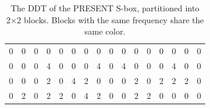 \begin{table}
    \caption{The DDT of the PRESENT S-box, partitioned into 2×2 blocks. Blocks with the same frequency share the same color.}
    \label{tab:present_ddt_blocks}
    
    \centering

    \begin{tabular}{|*{8}{w{c}{0.03\textwidth}w{c}{0.03\textwidth}|}}

        \hline
        
        \textcolor{Gelo}0 &
        \textcolor{Gelo}0 &
        0 & 0 & 
        \textcolor{Gelo}0 & \textcolor{Gelo}0 & 
        0 & 0 &
        0 & 0 & 
        \textcolor{Gelo}0 & \textcolor{Gelo}0 &
        0 & 0 & \textcolor{Gelo}0 & \textcolor{Gelo}0 \\
        
        \textcolor{Gelo}0 & \textcolor{Gelo}0 &
        0 & 4 & \textcolor{Gelo}0 & \textcolor{Gelo}0 &
        0 & 4 &
        0 & 4 & \textcolor{Gelo}0 & \textcolor{Gelo}0 &
        0 & 4 & \textcolor{Gelo}0 & \textcolor{Gelo}0 \\
        
        \hline
        
        0 & 0 & 0 & 2 & 0 & 4 & 2 & 0 & \textcolor{Gelo}0 & \textcolor{Gelo}0 &
        2 & 0 & 2 & 2 &
        2 & 0 \\
        
        0 & 2 & 0 & 2 & 2 & 0 & 4 & 2 & \textcolor{Gelo}0 & \textcolor{Gelo}0 &
        2 & 2 & 0 & 0 &
        0 & 0 \\
        

\end{tabular}
\end{table}

